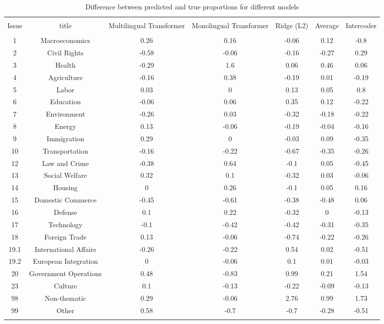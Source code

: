 
\begin{table}[!htbp] \centering 
  \caption{Difference between predicted and true proportions for different models} 
  \label{tab:aggregated-eval} 
\begin{tabular}{@{\extracolsep{5pt}} ccccccc} 
\\[-1.8ex]\hline 
\hline \\[-1.8ex] 
Issue & title & Multilingual Transformer & Monolingual Transformer & Ridge (L2) & Average & Intercoder \\ 
\hline \\[-1.8ex] 
1 & Macroeconomics & 0.26 & 0.16 & -0.06 & 0.12 & -0.8 \\ 
2 & Civil Rights & -0.58 & -0.06 & -0.16 & -0.27 & 0.29 \\ 
3 & Health & -0.29 & 1.6 & 0.06 & 0.46 & 0.06 \\ 
4 & Agriculture & -0.16 & 0.38 & -0.19 & 0.01 & -0.19 \\ 
5 & Labor & 0.03 & 0 & 0.13 & 0.05 & 0.8 \\ 
6 & Education & -0.06 & 0.06 & 0.35 & 0.12 & -0.22 \\ 
7 & Environment & -0.26 & 0.03 & -0.32 & -0.18 & -0.22 \\ 
8 & Energy & 0.13 & -0.06 & -0.19 & -0.04 & -0.16 \\ 
9 & Immigration & 0.29 & 0 & -0.03 & 0.09 & -0.35 \\ 
10 & Transportation & -0.16 & -0.22 & -0.67 & -0.35 & -0.26 \\ 
12 & Law and Crime & -0.38 & 0.64 & -0.1 & 0.05 & -0.45 \\ 
13 & Social Welfare & 0.32 & 0.1 & -0.32 & 0.03 & -0.06 \\ 
14 & Housing & 0 & 0.26 & -0.1 & 0.05 & 0.16 \\ 
15 & Domestic Commerce & -0.45 & -0.61 & -0.38 & -0.48 & 0.06 \\ 
16 & Defense & 0.1 & 0.22 & -0.32 & 0 & -0.13 \\ 
17 & Technology & -0.1 & -0.42 & -0.42 & -0.31 & -0.35 \\ 
18 & Foreign Trade & 0.13 & -0.06 & -0.74 & -0.22 & -0.26 \\ 
19.1 & International Affairs & -0.26 & -0.22 & 0.54 & 0.02 & -0.51 \\ 
19.2 & European Integration & 0 & -0.06 & 0.1 & 0.01 & -0.03 \\ 
20 & Government Operations & 0.48 & -0.83 & 0.99 & 0.21 & 1.54 \\ 
23 & Culture & 0.1 & -0.13 & -0.22 & -0.09 & -0.13 \\ 
98 & Non-thematic & 0.29 & -0.06 & 2.76 & 0.99 & 1.73 \\ 
99 & Other & 0.58 & -0.7 & -0.7 & -0.28 & -0.51 \\ 
\hline \\[-1.8ex] 
\end{tabular} 
\end{table} 
